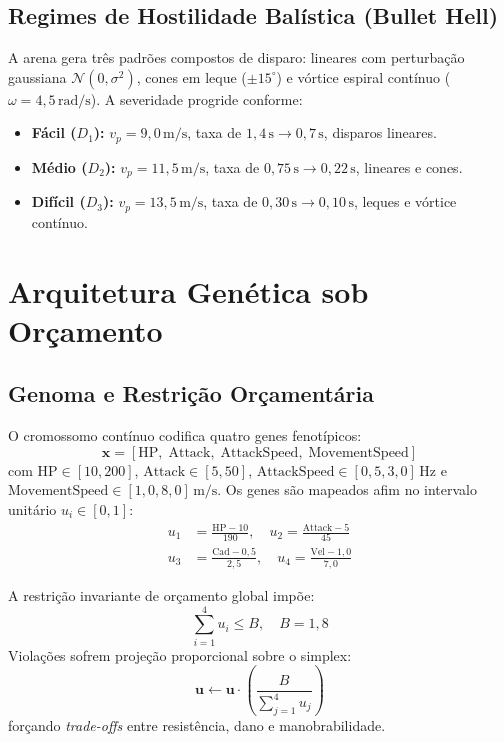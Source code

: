 \documentclass[10pt,conference,twocolumn]{article}
\begin{document}
\subsection{Regimes de Hostilidade Balística (Bullet Hell)}
A arena gera três padrões compostos de disparo: lineares com perturbação gaussiana $\mathcal{N}(0, \sigma^2)$, cones em leque ($\pm 15^\circ$) e vórtice espiral contínuo ($\omega = 4{,}5\,\text{rad/s}$). A severidade progride conforme:
\begin{itemize}
    \item \textbf{Fácil ($D_1$):} $v_p = 9{,}0\,\text{m/s}$, taxa de $1{,}4\,\text{s} \to 0{,}7\,\text{s}$, disparos lineares.
    \item \textbf{Médio ($D_2$):} $v_p = 11{,}5\,\text{m/s}$, taxa de $0{,}75\,\text{s} \to 0{,}22\,\text{s}$, lineares e cones.
    \item \textbf{Difícil ($D_3$):} $v_p = 13{,}5\,\text{m/s}$, taxa de $0{,}30\,\text{s} \to 0{,}10\,\text{s}$, leques e vórtice contínuo.
\end{itemize}

\section{Arquitetura Genética sob Orçamento}
\label{sec:ag}

\subsection{Genoma e Restrição Orçamentária}
O cromossomo contínuo codifica quatro genes fenotípicos:
\begin{equation}
\mathbf{x} = [\text{HP}, \; \text{Attack}, \; \text{AttackSpeed}, \; \text{MovementSpeed}]
\end{equation}
com $\text{HP} \in [10, 200]$, $\text{Attack} \in [5, 50]$, $\text{AttackSpeed} \in [0{,}5, 3{,}0]\,\text{Hz}$ e $\text{MovementSpeed} \in [1{,}0, 8{,}0]\,\text{m/s}$. Os genes são mapeados afim no intervalo unitário $u_i \in [0, 1]$:
\begin{align}
u_1 &= \frac{\text{HP}-10}{190}, \quad u_2 = \frac{\text{Attack}-5}{45} \label{eq:norm_genes1} \\
u_3 &= \frac{\text{Cad}-0{,}5}{2{,}5}, \quad u_4 = \frac{\text{Vel}-1{,}0}{7{,}0} \label{eq:norm_genes2}
\end{align}

A restrição invariante de orçamento global impõe:
\begin{equation}
\sum_{i=1}^4 u_i \le B, \quad B = 1{,}8 \label{eq:budget}
\end{equation}
Violações sofrem projeção proporcional sobre o simplex:
\begin{equation}
\mathbf{u} \leftarrow \mathbf{u} \cdot \left(\frac{B}{\sum_{j=1}^4 u_j}\right)
\end{equation}
forçando \textit{trade-offs} entre resistência, dano e manobrabilidade.
\end{document}
